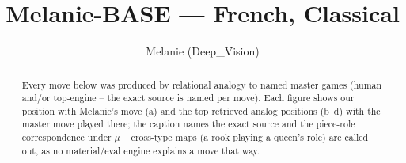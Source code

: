 \documentclass[11pt]{article}
\title{Melanie-BASE — French, Classical}
\author{Melanie (Deep\_Vision)}
\date{}
\begin{document}
\maketitle

\begin{abstract}Every move below was produced by relational analogy to named master games (human and/or top-engine -- the exact source is named per move). Each figure shows our position with Melanie's move (a) and the top retrieved analog positions (b--d) with the master move played there; the caption names the exact source and the piece-role correspondence under $\mu$ -- cross-type maps (a rook playing a queen's role) are called out, as no material/eval engine explains a move that way.\end{abstract}

\begin{figure}[p]\centering
\begin{subfigure}{0.46\textwidth}\centering
\resizebox{\linewidth}{!}{%
\newchessgame
\chessboard[
  setfen={rnb1k2r/pppnqppp/4p3/3pP3/3P4/2N5/PPP2PPP/R2QKBNR w KQkq - 0 7},
  showmover=false,
  pgfstyle=straightmove, color=movearrow, markmove={f2-f4}
]}
\caption{}
\end{subfigure}\hfill
\begin{subfigure}{0.46\textwidth}\centering
\resizebox{\linewidth}{!}{%
\newchessgame
\chessboard[
  setfen={rnb1k2r/pppnqppp/4p3/3pP3/3P4/2N5/PPP2PPP/R2QKBNR w KQkq - 0 7},
  showmover=false,
  pgfstyle=straightmove, color=movearrow, markmove={f2-f4}
]}
\caption{}
\end{subfigure}
\\[4pt]
\begin{subfigure}{0.46\textwidth}\centering
\resizebox{\linewidth}{!}{%
\newchessgame
\chessboard[
  setfen={rnb1k2r/pppnqppp/4p3/3pP3/3P4/2N5/PPP2PPP/R2QKBNR w KQkq - 0 7},
  showmover=false,
  pgfstyle=straightmove, color=movearrow, markmove={f2-f4}
]}
\caption{}
\end{subfigure}\hfill
\begin{subfigure}{0.46\textwidth}\centering
\resizebox{\linewidth}{!}{%
\newchessgame
\chessboard[
  setfen={rnb1k2r/pppnqppp/4p3/3pP3/3P4/2N5/PPP2PPP/R2QKBNR w KQkq - 0 7},
  showmover=false,
  pgfstyle=straightmove, color=movearrow, markmove={f2-f4}
]}
\caption{}
\end{subfigure}

\end{figure}
\end{document}
